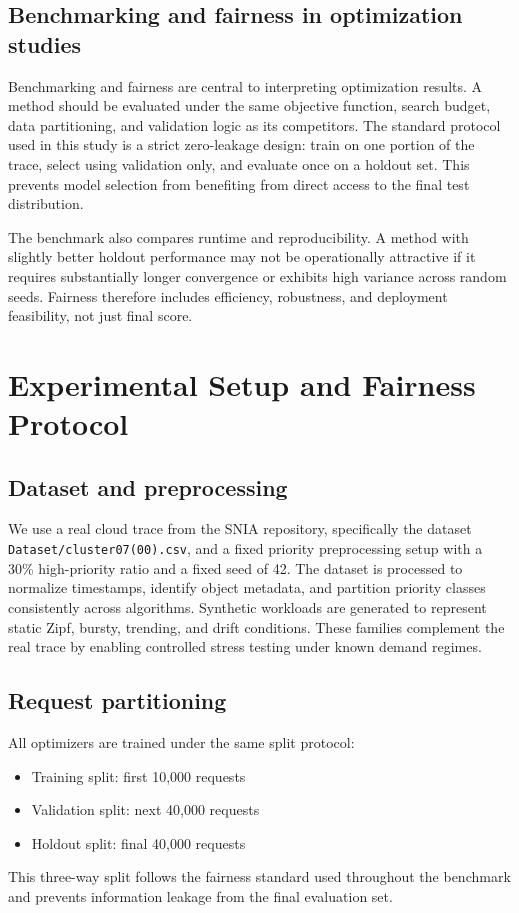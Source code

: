 \documentclass[10pt,journal,compsoc]{IEEEtran}
\begin{document}
\subsection{Benchmarking and fairness in optimization studies}
Benchmarking and fairness are central to interpreting optimization results. A method should be evaluated under the same objective function, search budget, data partitioning, and validation logic as its competitors. The standard protocol used in this study is a strict zero-leakage design: train on one portion of the trace, select using validation only, and evaluate once on a holdout set. This prevents model selection from benefiting from direct access to the final test distribution.

The benchmark also compares runtime and reproducibility. A method with slightly better holdout performance may not be operationally attractive if it requires substantially longer convergence or exhibits high variance across random seeds. Fairness therefore includes efficiency, robustness, and deployment feasibility, not just final score.

\section{Experimental Setup and Fairness Protocol}
\subsection{Dataset and preprocessing}
We use a real cloud trace from the SNIA repository, specifically the dataset \texttt{Dataset/cluster07(00).csv}, and a fixed priority preprocessing setup with a 30\% high-priority ratio and a fixed seed of 42. The dataset is processed to normalize timestamps, identify object metadata, and partition priority classes consistently across algorithms. Synthetic workloads are generated to represent static Zipf, bursty, trending, and drift conditions. These families complement the real trace by enabling controlled stress testing under known demand regimes.

\subsection{Request partitioning}
All optimizers are trained under the same split protocol:
\begin{itemize}
    \item Training split: first 10,000 requests
    \item Validation split: next 40,000 requests
    \item Holdout split: final 40,000 requests
\end{itemize}
This three-way split follows the fairness standard used throughout the benchmark and prevents information leakage from the final evaluation set.
\end{document}
